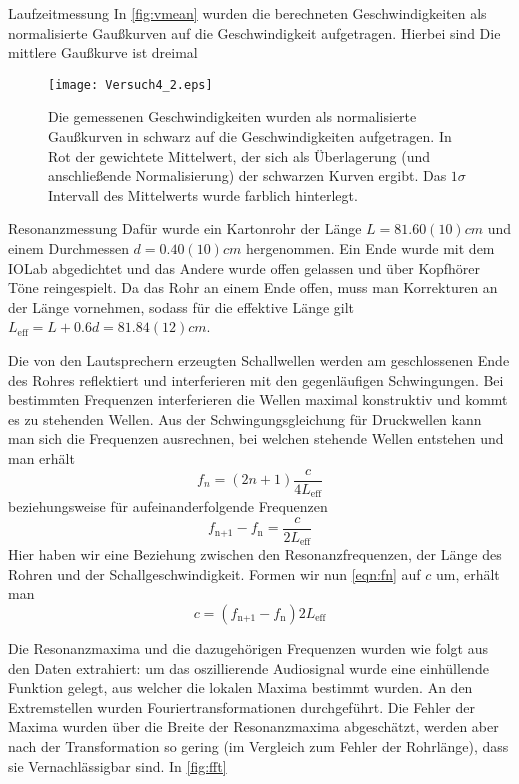\documentclass{alex_gp}
\begin{document}
\begin{mybox}{Laufzeitmessung}
	In \autoref{fig:vmean} wurden die berechneten Geschwindigkeiten als normalisierte Gaußkurven auf die Geschwindigkeit aufgetragen. Hierbei sind 
	Die mittlere Gaußkurve ist dreimal 
	\begin{figure}[H]	
		\centering
		\texttt{[image: Versuch4\_2.eps]}
		\caption{Die gemessenen Geschwindigkeiten wurden als normalisierte Gaußkurven in schwarz auf die Geschwindigkeiten aufgetragen. In Rot der gewichtete Mittelwert, der sich als Überlagerung (und anschließende Normalisierung) der schwarzen Kurven ergibt. Das \( 1\sigma \) Intervall des Mittelwerts wurde farblich hinterlegt.}
		\label{fig:vmean}
	\end{figure}
\end{mybox}

\begin{mybox}{Resonanzmessung}
	Dafür wurde ein Kartonrohr der Länge \( L = 81.60(10) \unit{cm} \) und einem Durchmessen \( d = 0.40(10) \unit{cm} \) hergenommen. Ein Ende wurde mit dem IOLab abgedichtet und das Andere wurde offen gelassen und über Kopfhörer Töne reingespielt. Da das Rohr an einem Ende offen, muss man Korrekturen an der Länge vornehmen, sodass für die effektive Länge gilt \( L_{\text{eff}} = L + 0.6d = 81.84(12) \unit{cm} \).
	
	Die von den Lautsprechern erzeugten Schallwellen werden am geschlossenen Ende des Rohres reflektiert und interferieren mit den gegenläufigen Schwingungen. Bei bestimmten Frequenzen interferieren die Wellen maximal konstruktiv und kommt es zu stehenden Wellen. Aus der Schwingungsgleichung für Druckwellen kann man sich die Frequenzen ausrechnen, bei welchen stehende Wellen entstehen und man erhält
	\begin{equation}\label{key}
		f_n = (2n+1)\frac{c}{4L_{\text{eff}}}
	\end{equation}
    beziehungsweise für aufeinanderfolgende Frequenzen
    \begin{equation}\label{eqn:fn}
    	f_{\text{n+1}} - f_{\text{n}} = \frac{c}{2L_{\text{eff}}}
    \end{equation}
	Hier haben wir eine Beziehung zwischen den Resonanzfrequenzen, der Länge des Rohren und der Schallgeschwindigkeit. Formen wir nun \autoref{eqn:fn} auf \( c \) um, erhält man
	\begin{equation}\label{eqn:cfn}
		c = \left(f_{\text{n+1}} - f_{\text{n}}\right) 2L_{\text{eff}}
	\end{equation}

	Die Resonanzmaxima und die dazugehörigen Frequenzen wurden wie folgt aus den Daten extrahiert: um das oszillierende Audiosignal wurde eine einhüllende Funktion gelegt, aus welcher die lokalen Maxima bestimmt wurden. An den Extremstellen wurden Fouriertransformationen durchgeführt. Die Fehler der Maxima wurden über die Breite der Resonanzmaxima abgeschätzt, werden aber nach der Transformation so gering (im Vergleich zum Fehler der Rohrlänge), dass sie Vernachlässigbar sind. In \autoref{fig:fft}
	

\end{mybox}
\end{document}
